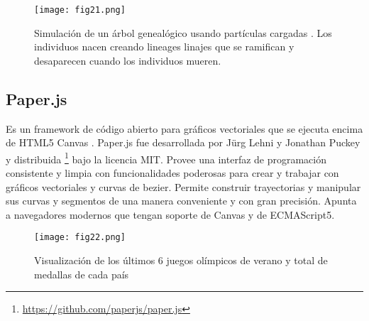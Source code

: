 \begin{figure}[htp]
  \centering
  \texttt{[image: fig21.png]}
  \caption[Simulación de un árbol genealógico usando partículas cargadas usando Processing.js]{Simulación de un árbol genealógico usando partículas cargadas \protect\footnotemark. Los individuos nacen creando lineages linajes que se ramifican y desaparecen cuando los individuos mueren.}
  \label{fig:fig21}
\end{figure}

\subsection{Paper.js}


Es un framework de código abierto para gráficos vectoriales que se ejecuta encima de HTML5 Canvas \cite{PaperJS}. Paper.js fue desarrollada por Jürg Lehni y Jonathan Puckey y distribuida \footnote{\url{https://github.com/paperjs/paper.js}} bajo la licencia MIT. Provee una interfaz de programación consistente y limpia con funcionalidades poderosas para crear y trabajar con gráficos vectoriales y curvas de bezier. Permite construir trayectorias y manipular sus curvas y segmentos de una manera conveniente y con gran precisión. Apunta a navegadores modernos que tengan soporte de Canvas y de ECMAScript5.

\begin{figure}[htp]
  \centering
  \texttt{[image: fig22.png]}
  \caption[Visualización de medallas en las Olimpiadas usando Paper.js]{Visualización de los últimos 6 juegos olímpicos de verano y total de medallas de cada país \protect\footnotemark}
  \label{fig:fig22}
\end{figure}

